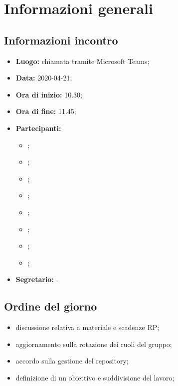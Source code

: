 \section{Informazioni generali}
\subsection{Informazioni incontro}
\begin{itemize}
	\item \textbf{Luogo:} chiamata tramite Microsoft Teams; 
	\item \textbf{Data:} 2020-04-21;
	\item \textbf{Ora di inizio:} 10.30; 
	\item \textbf{Ora di fine:} 11.45; 
	\item \textbf{Partecipanti:}
		\begin{itemize}
			\item \VB; 
			\item \LB; 
			\item \NF; 
			\item \EG; 
			\item \FJ; 
			\item \MP; 
			\item \AS; 
			\item \AZ; 
		\end{itemize}
	\item \textbf{Segretario:} \AS. 
\end{itemize}

\subsection{Ordine del giorno}
\begin{itemize}
	\item discussione relativa a materiale e scadenze RP;
	\item aggiornamento sulla rotazione dei ruoli del gruppo;
	\item accordo sulla gestione del repository;
	\item definizione di un obiettivo e suddivisione del lavoro;
\end{itemize}
